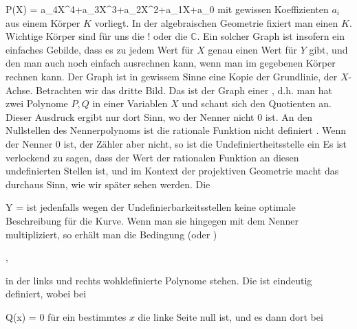 \mavergleichskettedisp
{\vergleichskette
{ P(X)
}
{ =} {a_4X^4+a_3X^3+a_2X^2+a_1X+a_0
}
{ } {
}
{ } {
}
{ } {
}
}
{}{}{}
mit gewissen Koeffizienten $a_i$ aus einem Körper $K$ vorliegt. In der algebraischen Geometrie fixiert man einen  {} $K$. Wichtige Körper sind für uns die  {}
 {!} {}
oder die  {} ${\mathbb C}$. Ein solcher Graph ist insofern ein einfaches Gebilde, dass es zu jedem Wert für $X$ genau einen Wert für $Y$
 {} {}
gibt, und den man auch noch einfach ausrechnen kann, wenn man im gegebenen Körper rechnen kann. Der Graph ist in gewissem Sinne eine  Kopie der Grundlinie, der $X$-Achse.
Betrachten wir das dritte Bild. Das ist der Graph einer  {,} d.h. man hat zwei Polynome $P,Q$ in einer Variablen $X$ und schaut sich den Quotienten
 an. Dieser Ausdruck ergibt nur dort Sinn, wo der Nenner nicht $0$ ist. An den Nullstellen des Nennerpolynoms ist die rationale Funktion nicht definiert
 {} {.}
Wenn der Nenner $0$ ist, der Zähler aber nicht, so ist die Undefiniertheitsstelle ein 
 {}
Es ist verlockend zu sagen, dass der Wert der rationalen Funktion an diesen undefinierten Stellen  ist, und im Kontext der projektiven Geometrie macht das durchaus Sinn, wie wir später sehen werden. Die 

\mavergleichskette
{\vergleichskette
{Y
}
{ = }{ {  }
}
{  }{
}
{    }{
}
{   }{
}
}
{}{}{}
ist jedenfalls wegen der Undefinierbarkeitsstellen keine optimale Beschreibung für die Kurve. Wenn man sie hingegen mit dem Nenner multipliziert, so erhält man die Bedingung (oder  {})

 { , }

in der links und rechts wohldefinierte Polynome stehen. Die  {}
 {} {}
ist eindeutig definiert, wobei bei

\mavergleichskette
{\vergleichskette
{ Q(x)
}
{ = }{ 0
}
{  }{
}
{    }{
}
{   }{
}
}
{}{}{}
für ein bestimmtes $x$ die linke Seite null ist, und es dann dort bei

